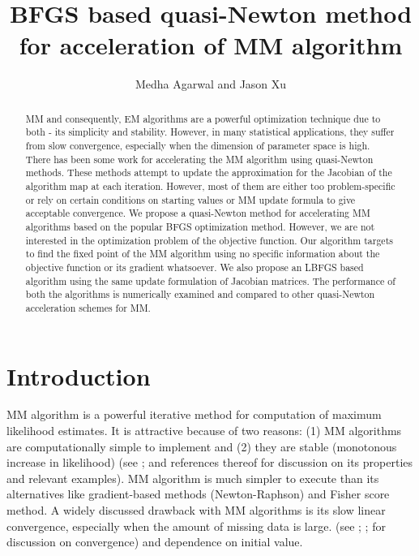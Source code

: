 \documentclass[12pt]{article}
\title{BFGS based quasi-Newton method for acceleration of MM algorithm}
\author{
  Medha Agarwal and Jason Xu
}
\begin{document}
\maketitle

\begin{abstract}
    MM and consequently, EM algorithms are a powerful optimization technique due to both - its simplicity and stability. However, in many statistical applications, they suffer from slow convergence, especially when the dimension of parameter space is high. There has been some work for accelerating the MM algorithm using quasi-Newton methods. These methods attempt to update the approximation for the Jacobian of the algorithm map at each iteration. However, most of them are either too problem-specific or rely on certain conditions on starting values or MM update formula to give acceptable convergence. We propose a quasi-Newton method for accelerating MM algorithms based on the popular BFGS optimization method. However, we are not interested in the optimization problem of the objective function. Our algorithm targets to find the fixed point of the MM algorithm using no specific information about the objective function or its gradient whatsoever. We also propose an LBFGS based algorithm using the same update formulation of Jacobian matrices. The performance of both the algorithms is numerically examined and compared to other quasi-Newton acceleration schemes for MM.
\end{abstract}


\section{Introduction}

MM algorithm is a powerful iterative method for computation of maximum likelihood estimates. It is attractive because of two reasons: (1) MM algorithms are computationally simple to implement and (2) they are stable (monotonous increase in likelihood) (see \cite{dempster1977maximum}; \cite{laird1978nonparametric} and references thereof for discussion on its properties and relevant examples). MM algorithm is much simpler to execute than its alternatives like gradient-based methods (Newton-Raphson) and Fisher score method. A widely discussed drawback with MM algorithms is its slow linear convergence, especially when the amount of missing data is large. (see \cite{wu1983convergence}; \cite{boyles1983convergence}; \cite{meng1994global} for discussion on convergence) and dependence on initial value. 
\end{document}
